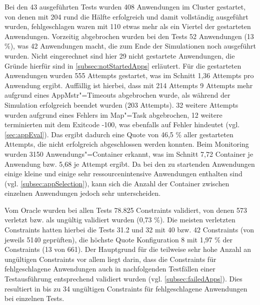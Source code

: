 Bei den 43 ausgeführten Tests wurden 408 Anwendungen im Cluster gestartet, von denen mit 204 rund die Hälfte erfolgreich und damit vollständig ausgeführt wurden, fehlgeschlagen waren mit 110 etwas mehr als ein Viertel der gestarteten Anwendungen.
Vorzeitig abgebrochen wurden bei den Tests 52 Anwendungen (13 \%), was 42 Anwendungen macht, die zum Ende der Simulationen noch ausgeführt wurden.
Nicht eingerechnet sind hier 29 nicht gestartete Anwendungen, die Gründe hierfür sind in \cref{subsec:notStartedApps} erläutert.
Für die gestarteten Anwendungen wurden 555 Attempts gestartet, was im Schnitt 1,36 Attempts pro Anwendung ergibt.
Auffällig ist hierbei, dass mit 214 Attempts 9 Attempts mehr aufgrund eines \gls{AppMstr}"=Timeouts abgebrochen wurde, als während der Simulation erfolgreich beendet wurden (203 Attempts).
32 weitere Attempts wurden aufgrund eines Fehlers im Map"=Task abgebrochen, 12 weitere terminierten mit dem Exitcode -100, was ebenfalls auf Fehler hindeutet (vgl. \cref{sec:appEval}).
Das ergibt dadurch eine Quote von 46,5 \% aller gestarteten Attempts, die nicht erfolgreich abgeschlossen werden konnten.
Beim Monitoring wurden 3150 Anwendungs"=Container erkannt, was im Schnitt 7,72 Container je Anwendung bzw. 5,68 je Attempt ergibt.
Da bei den zu startenden Anwendungen einige kleine und einige sehr ressourcenintensive Anwendungen enthalten sind (vgl. \cref{subsec:appSelection}), kann sich die Anzahl der Container zwischen einzelnen Anwendungen jedoch sehr unterscheiden.

Vom Oracle wurden bei allen Tests 78.825 Constraints validiert, von denen 573 verletzt bzw. als ungültig validiert wurden (0,73 \%).
Die meisten verletzten Constraints hatten hierbei die Tests 31.2 und 32 mit 40 bzw. 42 Constraints (von jeweils 5140 geprüften), die höchste Quote Konfiguration 8 mit 1,97 \% der Constraints (13 von 661).
Der Hauptgrund für die teilweise sehr hohe Anzahl an ungültigen Constraints vor allem liegt darin, dass die Constraints für fehlgeschlagene Anwendungen auch in nachfolgenden Testfällen einer Testausführung entsprechend validiert wurden (vgl. \cref{subsec:failedApps}).
Dies resultiert in bis zu 34 ungültigen Constraints für fehlgeschlagene Anwendungen bei einzelnen Tests.
